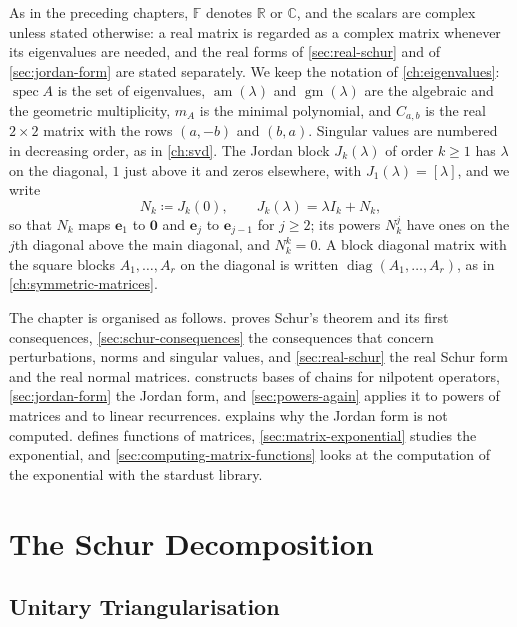 As in the preceding chapters, $\mathbb F$ denotes $\mathbb R$ or $\mathbb C$, and the scalars are complex unless stated otherwise: a real matrix is regarded as a complex matrix whenever its eigenvalues are needed, and the real forms of \cref{sec:real-schur} and of \cref{sec:jordan-form} are stated separately. We keep the notation of \cref{ch:eigenvalues}: $\operatorname{spec}A$ is the set of eigenvalues, $\operatorname{am}(\lambda)$ and $\operatorname{gm}(\lambda)$ are the algebraic and the geometric multiplicity, $m_A$ is the minimal polynomial, and $C_{a,b}$ is the real $2\times2$ matrix with the rows $(a,-b)$ and $(b,a)$. Singular values are numbered in decreasing order, as in \cref{ch:svd}. The Jordan block $J_k(\lambda)$ of order $k\ge1$ has $\lambda$ on the diagonal, $1$ just above it and zeros elsewhere, with $J_1(\lambda)=[\lambda]$, and we write
\[
N_k\coloneqq J_k(0),\qquad J_k(\lambda)=\lambda I_k+N_k ,
\]
so that $N_k$ maps $\mathbf e_1$ to $\mathbf 0$ and $\mathbf e_j$ to $\mathbf e_{j-1}$ for $j\ge2$; its powers $N_k^j$ have ones on the $j$th diagonal above the main diagonal, and $N_k^k=0$. A block diagonal matrix with the square blocks $A_1,\ldots,A_r$ on the diagonal is written $\operatorname{diag}(A_1,\ldots,A_r)$, as in \cref{ch:symmetric-matrices}.

The chapter is organised as follows.  proves Schur's theorem and its first consequences, \cref{sec:schur-consequences} the consequences that concern perturbations, norms and singular values, and \cref{sec:real-schur} the real Schur form and the real normal matrices.  constructs bases of chains for nilpotent operators, \cref{sec:jordan-form} the Jordan form, and \cref{sec:powers-again} applies it to powers of matrices and to linear recurrences.  explains why the Jordan form is not computed.  defines functions of matrices, \cref{sec:matrix-exponential} studies the exponential, and \cref{sec:computing-matrix-functions} looks at the computation of the exponential with the stardust library.

\section{The Schur Decomposition}
\label{sec:schur}

\subsection{Unitary Triangularisation}

